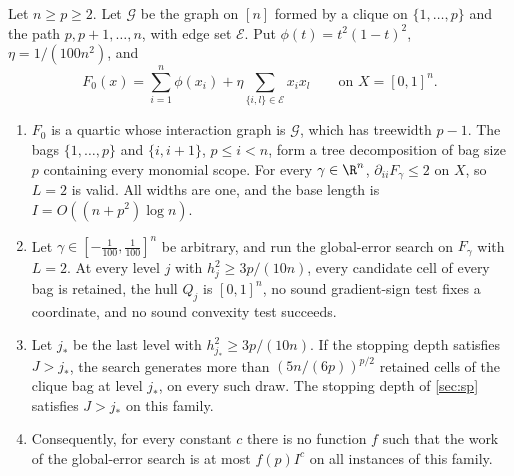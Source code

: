 \begin{theorem}\label{thm:lim:width}
Let $n\ge p\ge2$. Let $\mathcal G$ be the graph on $[n]$ formed by a
clique on $\{1,\ldots,p\}$ and the path $p,p+1,\ldots,n$, with edge set
$\mathcal E$. Put $\phi(t)=t^2(1-t)^2$, $\eta=1/(100n^2)$, and
\[
 F_0(x)=\sum_{i=1}^n\phi(x_i)+\eta\sum_{\{i,l\}\in\mathcal E}x_ix_l
 \qquad\text{on }X=[0,1]^n.
\]
\begin{enumerate}[label=(\alph*)]
\item\label{it:lim:width-instance} $F_0$ is a quartic whose interaction
graph is $\mathcal G$, which has treewidth $p-1$. The bags $\{1,\ldots,p\}$
and $\{i,i+1\}$, $p\le i<n$, form a tree decomposition of bag size $p$
containing every monomial scope. For every $\gamma\in\R^n$,
$\partial_{ii}F_\gamma\le2$ on $X$, so $L=2$ is valid. All widths are one,
and the base length is $I=O((n+p^2)\log n)$.
\item\label{it:lim:width-retain} Let $\gamma\in[-\frac1{100},\frac1{100}]^n$
be arbitrary, and run the global-error search on $F_\gamma$ with $L=2$. At
every level $j$ with $h_j^2\ge3p/(10n)$, every candidate cell of every bag
is retained, the hull $Q_j$ is $[0,1]^n$, no sound gradient-sign test fixes
a coordinate, and no sound convexity test succeeds.
\item\label{it:lim:width-count} Let $j_*$ be the last level with
$h_{j_*}^2\ge3p/(10n)$. If the stopping depth satisfies $J>j_*$, the search
generates more than $(5n/(6p))^{p/2}$ retained cells of the clique bag at
level $j_*$, on every such draw. The stopping depth of \cref{sec:sp}
satisfies $J>j_*$ on this family.
\item\label{it:lim:width-fpt} Consequently, for every constant $c$ there is
no function $f$ such that the work of the global-error search is at most
$f(p)I^c$ on all instances of this family.
\end{enumerate}
\end{theorem}

